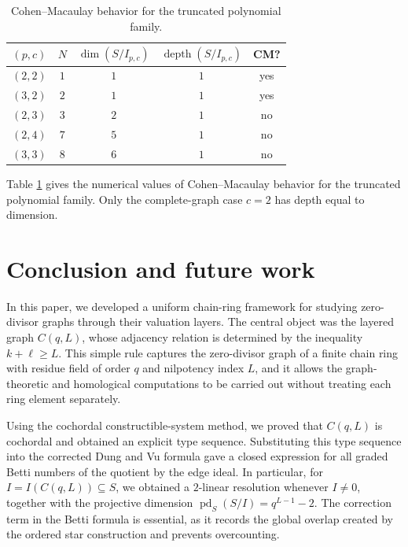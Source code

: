 \documentclass[12pt]{article}
\theoremstyle{definition}
\begin{document}
\medskip

\begin{table}[H]
	\centering
	\begin{tabular}{c c c c c}
		\toprule
		$(p,c)$ & $N$ & $\dim(S/I_{p,c})$ & $\operatorname{depth}(S/I_{p,c})$ & CM? \\
		\midrule
		$(2,2)$ & $1$ & $1$ & $1$ & yes \\
		$(3,2)$ & $2$ & $1$ & $1$ & yes \\
		$(2,3)$ & $3$ & $2$ & $1$ & no \\
		$(2,4)$ & $7$ & $5$ & $1$ & no \\
		$(3,3)$ & $8$ & $6$ & $1$ & no \\
		\bottomrule
	\end{tabular}
	\caption{Cohen--Macaulay behavior for the truncated polynomial family.}
	\label{tab:pc-CM-values}
\end{table}
Table \ref{tab:pc-CM-values} gives the numerical values of Cohen--Macaulay behavior for the truncated polynomial family.  Only the complete-graph case $c=2$ has depth equal to dimension.

\section{Conclusion and future work}\label{sec:conclusion} 
In this paper, we developed a uniform chain-ring framework for studying zero-divisor graphs through their valuation layers.  The central object was the layered graph $C(q,L)$, whose adjacency relation is determined by the inequality $k+\ell\ge L$.  This simple rule captures the zero-divisor graph of a finite chain ring with residue field of order $q$ and nilpotency index $L$, and it allows the graph-theoretic and homological computations to be carried out without treating each ring element separately.

\medskip

Using the cochordal constructible-system method, we proved that $C(q,L)$ is cochordal and obtained an explicit type sequence.  Substituting this type sequence into the corrected Dung and Vu \cite{DungVu2026} formula gave a closed expression for all graded Betti numbers of the quotient by the edge ideal.  In particular, for $I=I(C(q,L))\subseteq S$, we obtained a $2$-linear resolution whenever $I\ne0$, together with the projective dimension $ \operatorname{pd}_S(S/I)=q^{L-1}-2. $
The correction term in the Betti formula is essential, as it records the global overlap created by the ordered star construction and prevents overcounting.
\end{document}
